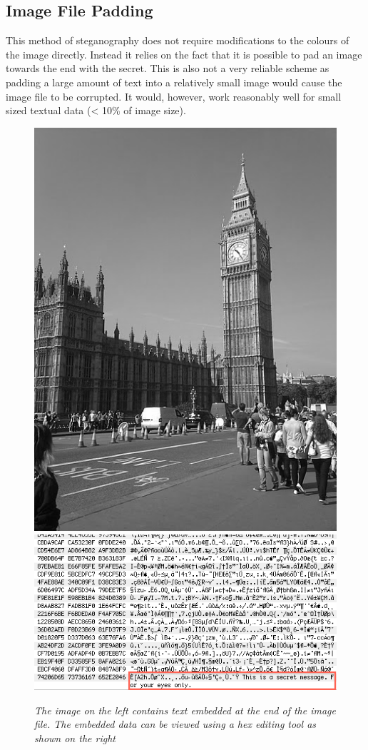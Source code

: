 \subsection{Image File Padding} This method of steganography does not require modifications to the colours of the image directly. Instead it relies on the fact that it is possible to pad an image towards the end with the secret. This is also not a very reliable scheme as padding a large amount of text into a relatively small image would cause the image file to be corrupted. It would, however, work reasonably well for small sized textual data (< 10\% of image size).
\begin{figure}[h!]
\includegraphics[scale=0.3]{embedded1}
\includegraphics[scale=0.5]{embedded2}
\caption{\emph{The image on the left contains text embedded at the end of the image file. The embedded data can be viewed using a hex editing tool as shown on the right}}
\label{fig:embedded}
\end{figure} 

